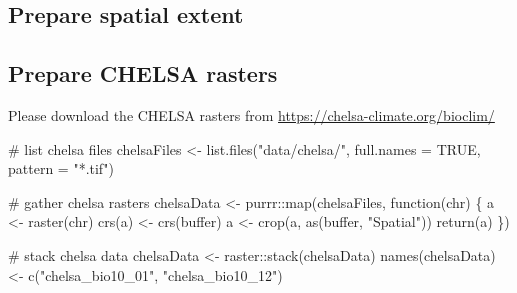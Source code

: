 \documentclass[]{article}
\newenvironment{Shaded}{}{}
\newcommand{\CommentTok}[1]{\textcolor[rgb]{0.00,0.50,0.00}{#1}}
\newcommand{\ControlFlowTok}[1]{\textcolor[rgb]{0.00,0.00,1.00}{#1}}
\newcommand{\DataTypeTok}[1]{#1}
\newcommand{\DecValTok}[1]{#1}
\newcommand{\FloatTok}[1]{#1}
\newcommand{\KeywordTok}[1]{\textcolor[rgb]{0.00,0.00,1.00}{#1}}
\newcommand{\NormalTok}[1]{#1}
\newcommand{\OperatorTok}[1]{#1}
\newcommand{\OtherTok}[1]{\textcolor[rgb]{1.00,0.25,0.00}{#1}}
\newcommand{\StringTok}[1]{\textcolor[rgb]{0.00,0.50,0.50}{#1}}
\begin{document}
\hypertarget{prepare-spatial-extent}{%
\subsection{Prepare spatial extent}\label{prepare-spatial-extent}}

\begin{Shaded}
\end{Shaded}

\hypertarget{prepare-chelsa-rasters}{%
\subsection{Prepare CHELSA rasters}\label{prepare-chelsa-rasters}}

Please download the CHELSA rasters from \url{https://chelsa-climate.org/bioclim/}

\begin{Shaded}
\begin{Highlighting}[numbers=left,,]
\CommentTok{# list chelsa files}
\NormalTok{chelsaFiles <-}\StringTok{ }\KeywordTok{list.files}\NormalTok{(}\StringTok{"data/chelsa/"}\NormalTok{, }\DataTypeTok{full.names =} \OtherTok{TRUE}\NormalTok{, }\DataTypeTok{pattern =} \StringTok{"*.tif"}\NormalTok{)}

\CommentTok{# gather chelsa rasters}
\NormalTok{chelsaData <-}\StringTok{ }\NormalTok{purrr}\OperatorTok{::}\KeywordTok{map}\NormalTok{(chelsaFiles, }\ControlFlowTok{function}\NormalTok{(chr) \{}
\NormalTok{  a <-}\StringTok{ }\KeywordTok{raster}\NormalTok{(chr)}
  \KeywordTok{crs}\NormalTok{(a) <-}\StringTok{ }\KeywordTok{crs}\NormalTok{(buffer)}
\NormalTok{  a <-}\StringTok{ }\KeywordTok{crop}\NormalTok{(a, }\KeywordTok{as}\NormalTok{(buffer, }\StringTok{"Spatial"}\NormalTok{))}
  \KeywordTok{return}\NormalTok{(a)}
\NormalTok{\})}

\CommentTok{# stack chelsa data}
\NormalTok{chelsaData <-}\StringTok{ }\NormalTok{raster}\OperatorTok{::}\KeywordTok{stack}\NormalTok{(chelsaData)}
\KeywordTok{names}\NormalTok{(chelsaData) <-}\StringTok{ }\KeywordTok{c}\NormalTok{(}\StringTok{"chelsa_bio10_01"}\NormalTok{, }\StringTok{"chelsa_bio10_12"}\NormalTok{)}
\end{Highlighting}
\end{Shaded}
\end{document}
